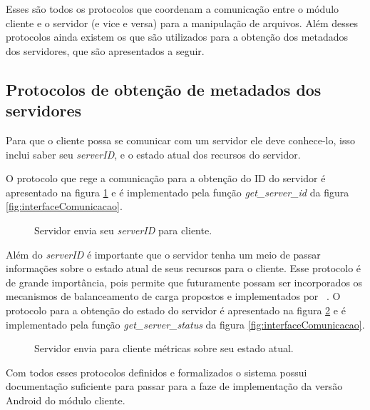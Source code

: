         
        Esses são todos os protocolos que coordenam a comunicação entre o módulo cliente e o servidor (e vice e versa) para a manipulação de arquivos. Além desses protocolos ainda existem os que são utilizados para a obtenção dos metadados dos servidores, que são apresentados a seguir.
        
        
        \subsection{Protocolos de obtenção de metadados dos servidores}
        
        Para que o cliente possa se comunicar com um servidor ele deve conhece-lo, isso inclui saber seu \textit{serverID}, e o estado atual dos recursos do servidor.
        
        O protocolo que rege a comunicação para a obtenção do ID do servidor é apresentado na figura \ref{fig:protGetServerID} e é implementado pela função \textit{get\_server\_id} da figura \ref{fig:interfaceComunicacao}.

        \begin{figure}[!ht]
        \caption{Servidor envia seu \textit{serverID} para cliente.}
        \label{fig:protGetServerID}
        \end{figure}
    
        Além do \textit{serverID} é importante que o servidor tenha um meio de passar informações sobre o estado atual de seus recursos para o cliente. Esse protocolo é de grande importância, pois permite que futuramente possam ser incorporados  os mecanismos de balanceamento de carga propostos e implementados por ~\cite{danilo}.
        O protocolo para a obtenção do estado do servidor é apresentado na figura \ref{fig:protServerGetStatus} e é implementado pela função \textit{get\_server\_status} da figura \ref{fig:interfaceComunicacao}.
        
         \begin{figure}[!ht]
         \caption{Servidor envia para cliente métricas sobre seu estado atual.}
         \label{fig:protServerGetStatus}
         \end{figure}
        
        Com todos esses protocolos definidos e formalizados o sistema possui documentação suficiente para passar para a faze de implementação da versão Android do módulo cliente.
        
